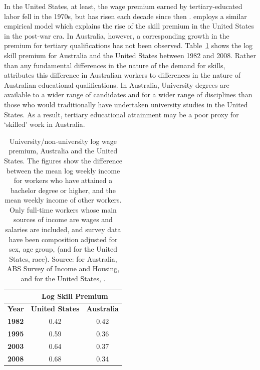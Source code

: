 In the United States, at least, the wage premium earned by tertiary-educated labor fell in the 1970s, but has risen each decade since then \citep{Acemoglu2011}. \citet{Katz1992} employs a similar empirical model which explains the rise of the skill premium in the United States in the post-war era. In Australia, however, a corresponding growth in the premium for tertiary qualifications has not been observed. Table~\ref{tbl:wagepremium} shows the log skill premium for Australia and the United States between 1982 and 2008. Rather than any fundamental differences in the nature of the demand for skills, \citet{Coelli2009} attributes this difference in Australian workers to differences in the nature of Australian educational qualifications. In Australia, University degrees are available to a wider range of candidates and for a wider range of disciplines than those who would traditionally have undertaken university studies in the United States. As a result, tertiary educational attainment may be a poor proxy for `skilled' work in Australia.
\begin{table}
  \centering
  \begin{tabular}{lcc}
  \hline
           & \multicolumn{2}{c}{\bf Log Skill Premium} \\
\hline
{\bf Year} &	{\bf United States} & {\bf Australia} \\
{\bf 1982} &	0.42 &	0.42 \\
{\bf 1995} &	0.59 &	0.36 \\
{\bf 2003} &	0.64 &	0.37 \\
{\bf 2008} &	0.68 &	0.34 \\ \hline
\end{tabular}
  \caption{University/non-university log wage premium, Australia and the United States. The figures show the difference between the mean log weekly income for workers who have attained a bachelor degree or higher, and the mean weekly income of other workers. Only full-time workers whose main sources of income are wages and salaries are included, and survey data have been composition adjusted for sex, age group, (and for the United States, race). Source: for Australia, ABS Survey of Income and Housing, and for the United States, \citet{Acemoglu2011}.}
  \label{tbl:wagepremium}
\end{table}

